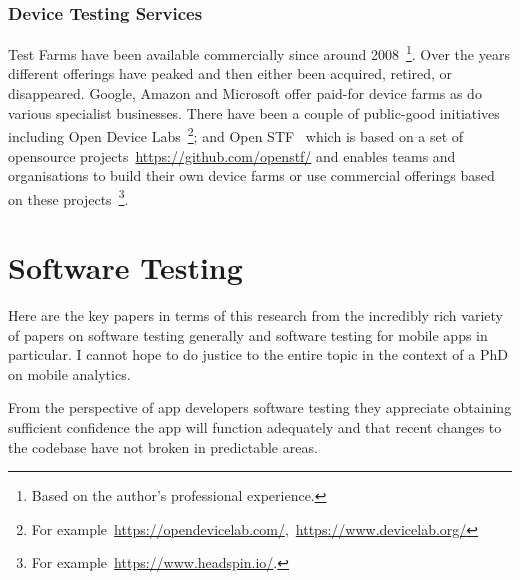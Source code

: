 \subsubsection{Device Testing Services}
Test Farms have been available commercially since around 2008~\footnote{Based on the author's professional experience.}. Over the years different offerings have peaked and then either been acquired, retired, or disappeared. Google, Amazon and Microsoft offer paid-for device farms as do various specialist businesses. There have been a couple of public-good initiatives including Open Device Labs~\footnote{For example~\url{https://opendevicelab.com/},~\url{https://www.devicelab.org/}}; and Open STF~\cite{openstf_website} which is based on a set of opensource projects~\url{https://github.com/openstf/} and enables teams and organisations to build their own device farms or use commercial offerings based on these projects~\footnote{For example~\url{https://www.headspin.io/}.}.


\section{Software Testing}
Here are the key papers in terms of this research from the incredibly rich variety of papers on software testing generally and software testing for mobile apps in particular. I cannot hope to do justice to the entire topic in the context of a PhD on mobile analytics.

From the perspective of app developers software testing they appreciate obtaining sufficient confidence the app will function adequately and that recent changes to the codebase have not broken in predictable areas. 


